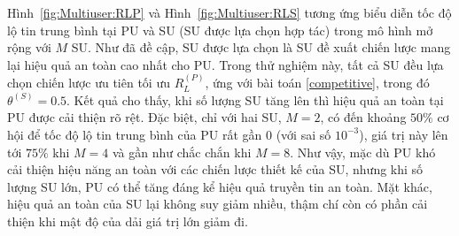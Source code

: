 \documentclass[../main.tex]{subfiles}
\begin{document}
Hình~\ref{fig:Multiuser:RLP} và Hình~\ref{fig:Multiuser:RLS} tương ứng biểu diễn tốc độ lộ tin trung bình tại PU và SU (SU được lựa chọn hợp tác) trong mô hình mở rộng với $M$ SU. Như đã đề cập, SU được lựa chọn là SU đề xuất chiến lược mang lại hiệu quả an toàn cao nhất cho PU. Trong thử nghiệm này, tất cả SU đều lựa chọn chiến lược ưu tiên tối ưu $R_L^{(P)}$, ứng với bài toán \eqref{competitive}, trong đó $\theta^{(S)} = 0.5$. Kết quả cho thấy, khi số lượng SU tăng lên thì hiệu quả an toàn tại PU được cải thiện rõ rệt. Đặc biệt, chỉ với hai SU, $M=2$, có đến khoảng $50\%$ cơ hội để tốc độ lộ tin trung bình của PU rất gần $0$ (với sai số $10^{-3}$), giá trị này lên tới $75\%$ khi $M=4$ và gần như chắc chắn khi $M=8$. Như vậy, mặc dù PU khó cải thiện hiệu năng an toàn với các chiến lược thiết kế của SU, nhưng khi số lượng SU lớn, PU có thể tăng đáng kể hiệu quả truyền tin an toàn. Mặt khác, hiệu quả an toàn của SU lại không suy giảm nhiều, thậm chí còn có phần cải thiện khi mật độ của dải giá trị lớn giảm đi.
\end{document}
